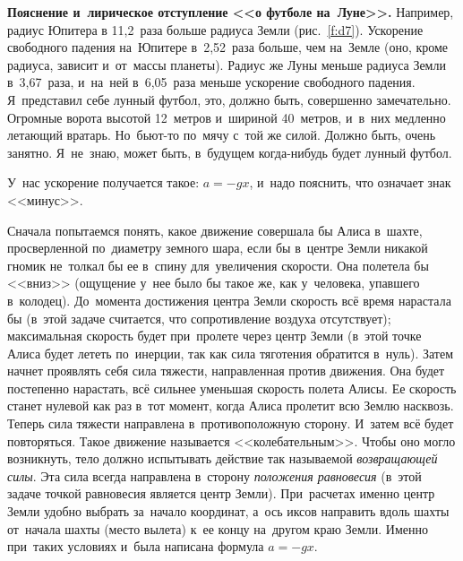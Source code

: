 \textbf{Пояснение и~лирическое отступление <<о футболе на~Луне>>.}
Например, радиус Юпитера в 11,2~раза больше
радиуса Земли (рис.~\ref{f:d7}). Ускорение свободного падения на~Юпитере в~2,52~раза больше, чем на~Земле
(оно, кроме радиуса, зависит и~от~массы планеты). Радиус же Луны меньше радиуса Земли в~3,67~раза,
и~на~ней в~6,05~раза меньше ускорение свободного падения. Я~представил себе лунный футбол, это,
должно быть, совершенно замечательно. Огромные ворота высотой 12~метров и~шириной 40~метров,
и~в~них медленно летающий вратарь. Но~бьют-то по~мячу с~той же силой. Должно быть, очень занятно.
Я~не~знаю, может быть, в~будущем когда-нибудь будет лунный футбол.

У~нас ускорение получается такое:
$a=-gx$, и~надо пояснить, что означает знак <<минус>>.


Сначала попытаемся понять, какое движение совершала бы Алиса в~шахте, просверленной по~диаметру
земного шара, если бы в~центре Земли никакой гномик не~толкал бы ее в~спину для~увеличения
скорости. Она полетела бы <<вниз>> (ощущение у~нее было бы такое же, как у~человека, упавшего
в~колодец). До~момента достижения центра Земли скорость всё время нарастала бы (в~этой задаче
считается, что сопротивление воздуха отсутствует); максимальная скорость будет при~пролете через
центр Земли (в~этой точке Алиса будет лететь по~инерции, так как сила тяготения обратится в~нуль).
Затем начнет проявлять себя сила тяжести, направленная против движения. Она будет постепенно
нарастать, всё сильнее уменьшая скорость полета Алисы. Ее скорость станет нулевой как раз в~тот
момент, когда Алиса пролетит всю Землю насквозь. Теперь сила тяжести направлена в~противоположную
сторону. И~затем всё будет повторяться. Такое движение называется <<колебательным>>. Чтобы оно
могло возникнуть, тело должно испытывать действие так называемой \textit{возвращающей силы}. Эта сила всегда
направлена в~сторону \textit{положения равновесия} (в~этой задаче точкой равновесия является центр Земли).
При~расчетах именно центр Земли удобно выбрать за~начало координат, а~ось иксов направить вдоль
шахты от~начала шахты (место вылета) к~ее концу на~другом краю Земли. Именно при~таких условиях
и~была написана формула $a=-gx$.


